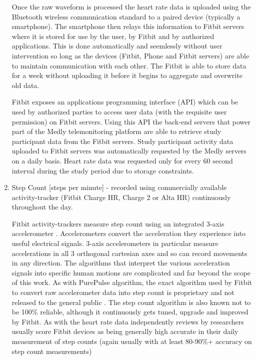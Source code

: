 \documentclass[]{article}
\begin{document}
\begin{enumerate}
	Once the raw waveform is processed the heart rate data is uploaded using the Bluetooth wireless communication standard to a paired device (typically a smartphone). The smartphone then relays this information to Fitbit servers where it is stored for use by the user, by Fitbit and by authorized applications. This is done automatically and seemlessly without user intervention so long as the devices (Fitbit, Phone and Fitbit servers) are able to maintain communication with each other. The Fitbit is able to store data for a week without uploading it before it begins to aggregate and overwrite old data.
	
	Fitbit exposes an applications programming interface (API) which can be used by authorized parties to access user data (with the requisite user permission) on Fitbit servers. Using this API the back-end servers that power part of the Medly telemonitoring platform are able to retrieve study participant data from the Fitbit servers. Study participant activity data uploaded to Fitbit servers was automatically requested by the Medly servers on a daily basis. Heart rate data was requested only for every 60 second interval during the study period due to storage constraints.
	 
	\item Step Count [steps per minute] - recorded using commercially available activity-tracker (Fitbit Charge HR, Charge 2 or Alta HR) continuously throughout the day.
	
	Fitbit activity-trackers measure step count using an integrated 3-axis accelerometer \cite{FitbitInc.2017a}. Accelerometers convert the acceleration they experience into useful electrical signals. 3-axis accelerometers in particular measure accelerations in all 3 orthogonal cartesian axes and so can record movements in any direction. The algorithms that interpret the various acceleration signals into specific human motions are complicated and far beyond the scope of this work. As with PurePulse algorithm, the exact algorithm used by Fitbit to convert raw accelerometer data into step count is proprietary and not released to the general public \cite{FitbitInc.2017a}. The step count algorithm is also known not to be 100\% reliable, although it continuously gets tuned, upgrade and improved by Fitbit\cite{FitbitInc.2017b}. As with the heart rate data independently reviews by researchers usually score Fitbit devices as being generally high accurate in their daily measurement of step counts (again usually with at least 80-90\%+ accuracy on step count measurements) \cite{Kooiman2015,An2017,Diaz2015,Wen2017,El-Amrawy2015,Ferguson2015,Bornstein2011}
	

\end{enumerate}
\end{document}
